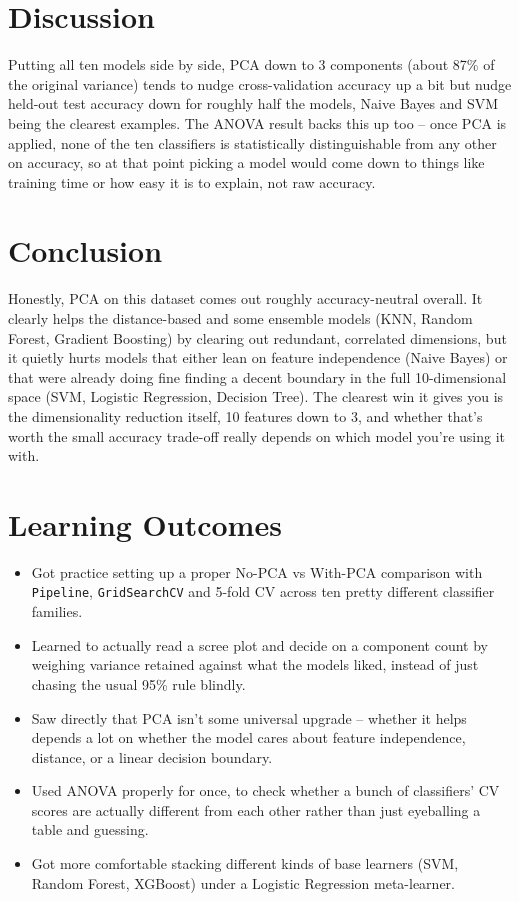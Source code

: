 \documentclass[12pt,a4paper]{article}
\begin{document}
\section{Discussion}
Putting all ten models side by side, PCA down to 3 components (about 87\% of the original variance)
tends to nudge cross-validation accuracy up a bit but nudge held-out test accuracy down for roughly
half the models, Naive Bayes and SVM being the clearest examples. The ANOVA result backs this up too
-- once PCA is applied, none of the ten classifiers is statistically distinguishable from any other on
accuracy, so at that point picking a model would come down to things like training time or how easy it
is to explain, not raw accuracy.

\section{Conclusion}
Honestly, PCA on this dataset comes out roughly accuracy-neutral overall. It clearly helps the
distance-based and some ensemble models (KNN, Random Forest, Gradient Boosting) by clearing out
redundant, correlated dimensions, but it quietly hurts models that either lean on feature independence
(Naive Bayes) or that were already doing fine finding a decent boundary in the full 10-dimensional
space (SVM, Logistic Regression, Decision Tree). The clearest win it gives you is the dimensionality
reduction itself, 10 features down to 3, and whether that's worth the small accuracy trade-off really
depends on which model you're using it with.

\section{Learning Outcomes}
\begin{itemize}
\item Got practice setting up a proper No-PCA vs With-PCA comparison with \texttt{Pipeline},
\texttt{GridSearchCV} and 5-fold CV across ten pretty different classifier families.
\item Learned to actually read a scree plot and decide on a component count by weighing variance
retained against what the models liked, instead of just chasing the usual 95\% rule blindly.
\item Saw directly that PCA isn't some universal upgrade -- whether it helps depends a lot on whether
the model cares about feature independence, distance, or a linear decision boundary.
\item Used ANOVA properly for once, to check whether a bunch of classifiers' CV scores are actually
different from each other rather than just eyeballing a table and guessing.
\item Got more comfortable stacking different kinds of base learners (SVM, Random Forest, XGBoost)
under a Logistic Regression meta-learner.
\end{itemize}
\end{document}
